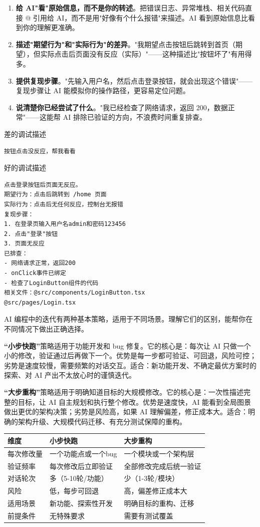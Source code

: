 \begin{enumerate}
  \item \textbf{给 AI"看"原始信息，而不是你的转述}。把错误日志、异常堆栈、相关代码直接 @ 引用给 AI，而不是用"好像有个什么报错"来描述。AI 看到原始信息比看到你的理解更准确。
  \item \textbf{描述"期望行为"和"实际行为"的差异}。"我期望点击按钮后跳转到首页（期望），但实际点击后页面没有反应（实际）"——这种描述比"按钮坏了"有用得多。
  \item \textbf{提供复现步骤}。"先输入用户名，然后点击登录按钮，就会出现这个错误"——复现步骤让 AI 能模拟你的操作路径，更容易定位问题。
  \item \textbf{说清楚你已经尝试了什么}。"我已经检查了网络请求，返回 200，数据正常"——这能帮 AI 排除已验证的方向，不浪费时间重复排查。
\end{enumerate}

差的调试描述

\begin{lstlisting}
按钮点击没反应，帮我看看
\end{lstlisting}

好的调试描述

\begin{lstlisting}
点击登录按钮后页面无反应。
期望行为：点击后跳转到 /home 页面
实际行为：点击后无任何反应，控制台无报错
复现步骤：
1. 在登录页输入用户名admin和密码123456
2. 点击"登录"按钮
3. 页面无反应
已排查：
- 网络请求正常，返回200
- onClick事件已绑定
- 检查了LoginButton组件的代码
相关文件：@src/components/LoginButton.tsx
@src/pages/Login.tsx
\end{lstlisting}


AI 编程中的迭代有两种基本策略，适用于不同场景。理解它们的区别，能帮你在不同情况下做出正确选择。

\textbf{“小步快跑”}策略适用于功能开发和 bug 修复。它的核心是：每次让 AI 只做一个小的修改，验证通过后再做下一个。优势是每一步都可验证、可回退，风险可控；劣势是速度较慢，需要频繁的对话交互。适合：新功能开发、不确定最优方案时的探索、对 AI 产出不太放心时的谨慎迭代。

\textbf{“大步重构”}策略适用于明确知道目标的大规模修改。它的核心是：一次性描述完整的目标，让 AI 自主规划和执行整个修改。优势是速度快，AI 能看到全局图景做出更优的架构决策；劣势是风险高，如果 AI 理解偏差，修正成本大。适合：明确的架构升级、大规模代码迁移、有充分测试保障的重构。

\begin{center}
\begin{tabularx}{\linewidth}{|X|X|X|}
\hline
\textbf{维度} & \textbf{小步快跑} & \textbf{大步重构} \tabularnewline
\hline
每次修改量 & 一个功能点或一个bug & 一个模块或一个架构层 \tabularnewline
验证频率 & 每次修改后立即验证 & 全部修改完成后统一验证 \tabularnewline
对话轮次 & 多（5-10轮/功能） & 少（1-3轮/模块） \tabularnewline
风险 & 低，每步可回退 & 高，偏差修正成本大 \tabularnewline
适用场景 & 新功能、探索性开发 & 明确目标的重构、迁移 \tabularnewline
前提条件 & 无特殊要求 & 需要有测试覆盖 \tabularnewline
\hline
\end{tabularx}
\end{center}

